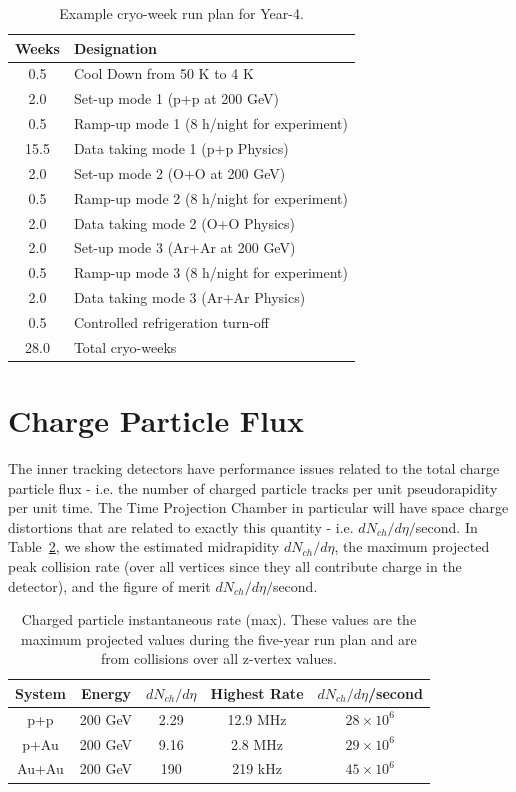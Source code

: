 \begin{table}
\centering
\begin{tabular}{ | c | l | }
\hline
Weeks & Designation \\ \hline
0.5  & Cool Down from 50 K to 4 K \\ \hline
2.0  & Set-up mode 1 (p+p at 200 GeV) \\ \hline
0.5  & Ramp-up mode 1 (8 h/night for experiment) \\ \hline
15.5 & Data taking mode 1 (p+p Physics) \\ \hline
2.0  & Set-up mode 2 (O+O at 200 GeV) \\ \hline
0.5  & Ramp-up mode 2 (8 h/night for experiment) \\ \hline
2.0 & Data taking mode 2 (O+O Physics) \\ \hline
2.0  & Set-up mode 3 (Ar+Ar at 200 GeV) \\ \hline
0.5  & Ramp-up mode 3 (8 h/night for experiment) \\ \hline
2.0 & Data taking mode 3 (Ar+Ar Physics) \\ \hline
0.5  & Controlled refrigeration turn-off \\ \hline \hline \hline
28.0 & Total cryo-weeks \\
\hline
\end{tabular}
\caption{Example cryo-week run plan for Year-4.\label{tab:cryo2023}}
\end{table}

\section{Charge Particle Flux}

The inner tracking detectors have performance issues related to the total charge particle flux - i.e. the number of charged particle tracks per unit pseudorapidity per unit time.   The Time Projection Chamber in particular will have space charge distortions that are related to exactly this quantity - i.e. $dN_{ch}/d\eta/$second.   In Table~\ref{tab:chargerates}, we show the estimated midrapidity $dN_{ch}/d\eta$, the maximum projected peak collision rate (over all vertices since they all contribute charge in the detector), and the figure of merit $dN_{ch}/d\eta/$second.

\begin{table}[h]
\centering
\caption{Charged particle instantaneous rate (max).  These values are the maximum projected values during the five-year run plan and are from collisions over all z-vertex values.\label{tab:chargerates}}
\bigskip
\begin{tabular}{ | c | c | c | c | c |}
\hline
System & Energy & $dN_{ch}/d\eta$ & Highest Rate & $dN_{ch}/d\eta$/second \\ \hline \hline
p+p & 200 GeV & 2.29 & 12.9 MHz & $28 \times 10^{6}$ \\ \hline
p+Au & 200 GeV & 9.16 & 2.8 MHz & $29 \times 10^{6}$ \\ \hline
Au+Au & 200 GeV & 190 & 219 kHz & $45 \times 10^{6}$ \\ \hline
\end{tabular}
\end{table}

